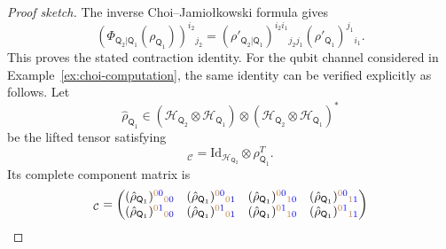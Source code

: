 \documentclass[
    aps,
    pra,
    reprint,
    superscriptaddress,
    nofootinbib
]{revtex4-2}
\theoremstyle{definition}
\theoremstyle{plain}
\begin{document}
\begin{proof}[Proof sketch]
        The inverse Choi--Jamio{\l}kowski formula gives
        \begin{equation}
            \left(
                \Phi_{\mathsf{Q}_{2}|\mathsf{Q}_{1}}
                \left(\rho_{\mathsf{Q}_{1}}\right)
            \right)^{i_{2}}{}_{j_{2}}
            =
            (\rho'_{\mathsf{Q}_{2}|\mathsf{Q}_{1}})
            ^{i_{2}i_{1}}{}_{j_{2}j_{1}}
            (\rho'_{\mathsf{Q}_{1}})^{j_{1}}{}_{i_{1}}.
        \end{equation}
        This proves the stated contraction identity. For the qubit
        channel considered in Example~\ref{ex:choi-computation}, the
        same identity can be verified explicitly as follows. Let
        \begin{equation}
            \hat{\rho}_{\mathsf{Q}_{1}}
            \in
            (\mathcal{H}_{\mathsf{Q}_{2}}
            \otimes\mathcal{H}_{\mathsf{Q}_{1}})
            \otimes
            (\mathcal{H}_{\mathsf{Q}_{2}}
            \otimes\mathcal{H}_{\mathsf{Q}_{1}})^{*}
        \end{equation}
        be the lifted tensor satisfying
        \begin{equation}
            [\hat{\rho}_{\mathsf{Q}_{1}}]_{\mathcal{C}}
            =
            \mathrm{Id}_{\mathcal{H}_{\mathsf{Q}_{2}}}
            \otimes
            \rho_{\mathsf{Q}_{1}}^{T}.
        \end{equation}
        Its complete component matrix is
        \begin{equation}
        [\hat{\rho}_{\mathsf{Q}_{1}}]_{\mathcal{C}}
        =
        \begin{pmatrix}
        (\hat{\rho}_{\mathsf{Q}_{1}})^{\color{brown}0\color{blue}0}{}_{\color{brown}0\color{blue}0}&
        (\hat{\rho}_{\mathsf{Q}_{1}})^{\color{brown}0\color{blue}0}{}_{\color{brown}0\color{blue}1}&
        (\hat{\rho}_{\mathsf{Q}_{1}})^{\color{brown}0\color{blue}0}{}_{\color{brown}1\color{blue}0}&
        (\hat{\rho}_{\mathsf{Q}_{1}})^{\color{brown}0\color{blue}0}{}_{\color{brown}1\color{blue}1}\\
        (\hat{\rho}_{\mathsf{Q}_{1}})^{\color{brown}0\color{blue}1}{}_{\color{brown}0\color{blue}0}&
        (\hat{\rho}_{\mathsf{Q}_{1}})^{\color{brown}0\color{blue}1}{}_{\color{brown}0\color{blue}1}&
        (\hat{\rho}_{\mathsf{Q}_{1}})^{\color{brown}0\color{blue}1}{}_{\color{brown}1\color{blue}0}&
        (\hat{\rho}_{\mathsf{Q}_{1}})^{\color{brown}0\color{blue}1}{}_{\color{brown}1\color{blue}1}\\

\end{pmatrix}
\end{equation}
\end{proof}
\end{document}
